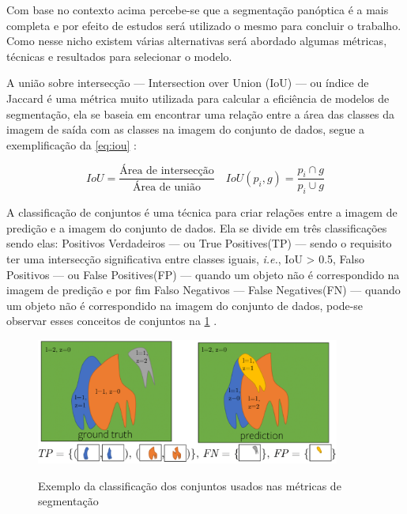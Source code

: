 Com base no contexto acima percebe-se que a segmentação panóptica é a mais completa e por efeito de estudos será utilizado o mesmo para concluir o trabalho. Como nesse nicho existem várias alternativas será abordado algumas métricas, técnicas e resultados para selecionar o modelo.


A união sobre intersecção — Intersection over Union (IoU) — ou índice de Jaccard é uma métrica muito utilizada para calcular a eficiência de modelos de segmentação, ela se baseia em encontrar uma relação entre a área das classes da imagem de saída com as classes na imagem do conjunto de dados, segue a exemplificação da \cref{eq:iou} \cite{dp_semantic_segmantation, lapix, kirillov2019panoptic}:

\begin{equation}
	\label{eq:iou}	
	IoU = \frac{\text{Área de intersecção}}{\text{Área de união}} \quad IoU(p_i, g) = \frac{p_i \cap g}{ p_i \cup g}
\end{equation}



A classificação de conjuntos é uma técnica para criar relações entre a imagem de predição e a imagem do conjunto de dados. Ela se divide em três classificações sendo elas: Positivos Verdadeiros — ou True Positives(TP) — sendo o requisito ter uma intersecção significativa entre classes iguais, \emph{i.e.}, IoU > 0.5, Falso Positivos — ou False Positives(FP) — quando um objeto não é correspondido na imagem de predição e por fim Falso Negativos — False Negatives(FN) — quando um objeto não é correspondido na imagem do conjunto de dados, pode-se observar esses conceitos de conjuntos na \cref{fig:conjuntos} \cite{kirillov2019panoptic}.
\begin{figure}[H]
	\caption{Exemplo da classificação dos conjuntos usados nas métricas de segmentação}
	\centering %
	\includegraphics[width=10cm]{figures/pan_metric.png} %
	\label{fig:conjuntos}
\end{figure}

